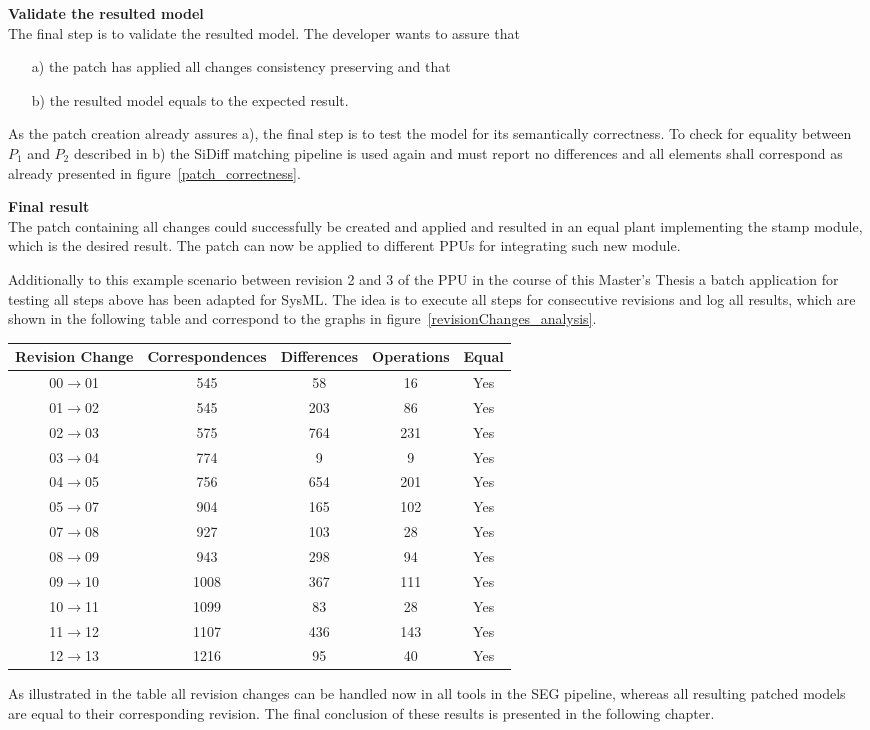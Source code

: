 \textbf{Validate the resulted model} \\
The final step is to validate the resulted model. The developer wants to assure
that
\begin{itemize}
  \item[a)] the patch has applied all changes consistency preserving and that
  \item[b)] the resulted model equals to the expected result.
\end{itemize}

As the patch creation already assures a), the final step is to test the model
for its semantically correctness. To check for equality between $P_1$ and $P_2$
described in b) the SiDiff matching pipeline is used again and must report no
differences and all elements shall correspond as already presented in
figure~\ref{patch_correctness}.

\textbf{Final result} \\
The patch containing all changes could successfully be created and applied and
resulted in an equal plant implementing the stamp module, which is the desired
result. The patch can now be applied to different \ac{PPU}s for integrating such
new module.

Additionally to this example scenario between revision 2 and 3 of the \ac{PPU}
in the course of this Master's Thesis a batch application for testing all steps
above has been adapted for \ac{SysML}. The idea is to execute all steps for
consecutive revisions and log all results, which are shown in the
following table and correspond to the graphs in
figure~\ref{revisionChanges_analysis}.

\begin{center}
{\footnotesize
\begin{tabular}{|c|c|c|c|c|}
Revision Change & Correspondences & Differences & Operations & Equal\\
\hline
00$\rightarrow$01 & 545 & 58 & 16  & {\color{green}Yes} \\
01$\rightarrow$02 & 545 & 203 & 86  & {\color{green}Yes} \\
02$\rightarrow$03 & 575 & 764 & 231  & {\color{green}Yes} \\
03$\rightarrow$04 & 774 & 9 & 9  & {\color{green}Yes} \\
04$\rightarrow$05 & 756 & 654 & 201  & {\color{green}Yes} \\
05$\rightarrow$07 & 904 & 165 & 102  & {\color{green}Yes} \\
07$\rightarrow$08 & 927 & 103 & 28  & {\color{green}Yes} \\
08$\rightarrow$09 & 943 & 298 & 94  & {\color{green}Yes} \\
09$\rightarrow$10 & 1008 & 367 & 111  & {\color{green}Yes} \\
10$\rightarrow$11 & 1099 & 83 & 28  & {\color{green}Yes} \\
11$\rightarrow$12 & 1107 & 436 & 143  & {\color{green}Yes} \\
12$\rightarrow$13 & 1216 & 95 & 40  & {\color{green}Yes} \\
\hline
\end{tabular}
}
\end{center}

As illustrated in the table all revision changes can be handled now in all
tools in the \ac{SEG} pipeline, whereas all resulting patched models are equal
to their corresponding revision. The final conclusion of these results is
presented in the following chapter.